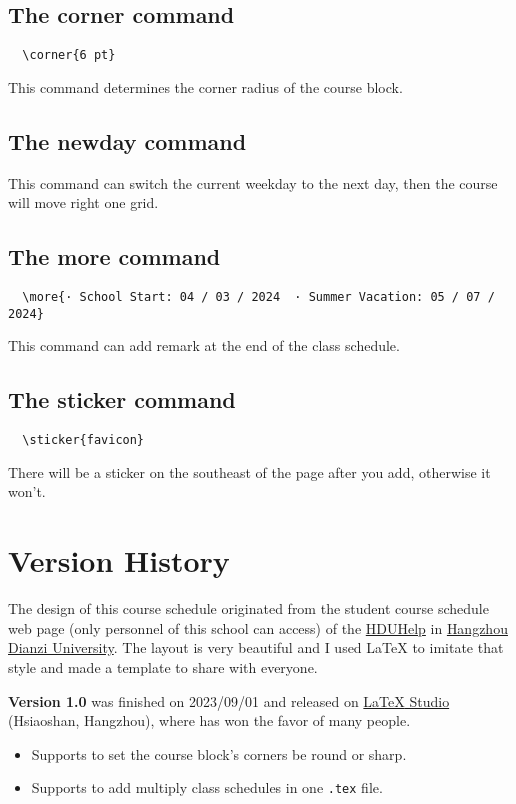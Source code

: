 \documentclass[11pt]{article}
\def\cmd#1{\texorpdfstring{\textcolor{cmdcolor}{\textsf{#1}}}{“#1”}}
\def\datechange#1#2{%
  \noindent{\makebox[\textwidth][r]{\color{H7}\rule{1.15\textwidth}{.4pt}}}
  \noindent\makebox[0pt][r]{\makebox[-3em][r]{\small\textbf{\textcolor{H7}{#1}}}\;\;}{\sffamily Update: \ignorespaces#2}}
\begin{document}
\subsection{The \cmd{corner} command}
\begin{verbatim}
  \corner{6 pt}
\end{verbatim}

This command determines the corner radius of the course block.

\subsection{The \cmd{newday} command}
This command can switch the current weekday to the next day, then the course will move right one grid.

\subsection{The \cmd{more} command}
\begin{verbatim}
  \more{· School Start: 04 / 03 / 2024  · Summer Vacation: 05 / 07 / 2024}
\end{verbatim}

This command can add remark at the end of the class schedule.

\subsection{The \cmd{sticker} command}
\begin{verbatim}
  \sticker{favicon}
\end{verbatim}

There will be a sticker on the southeast of the page after you add, otherwise it won't.

\section{Version History}

The design of this course schedule originated from the student course schedule web page (only personnel of this school can access) of the \href{https://www.hduhelp.cn/}{HDUHelp} in \href{https://www.hdu.edu.cn}{Hangzhou Dianzi University}. The layout is very beautiful and I used \textsf{\LaTeX} to imitate that style and made a template to share with everyone.

\textsf{\bfseries Version 1.0} was finished on 2023/09/01 and released on \href{https://www.latexstudio.net}{\textsf{\LaTeX} Studio} (Hsiaoshan, Hangzhou), where has won the favor of many people.
\clearpage
{}
\datechange{2023/11/01}{Version 2.0a}
\begin{itemize}
    \item Supports to set the course block's corners be round or sharp.
    \item Supports to add multiply class schedules in one \verb|.tex| file.
\end{itemize}
\end{document}

